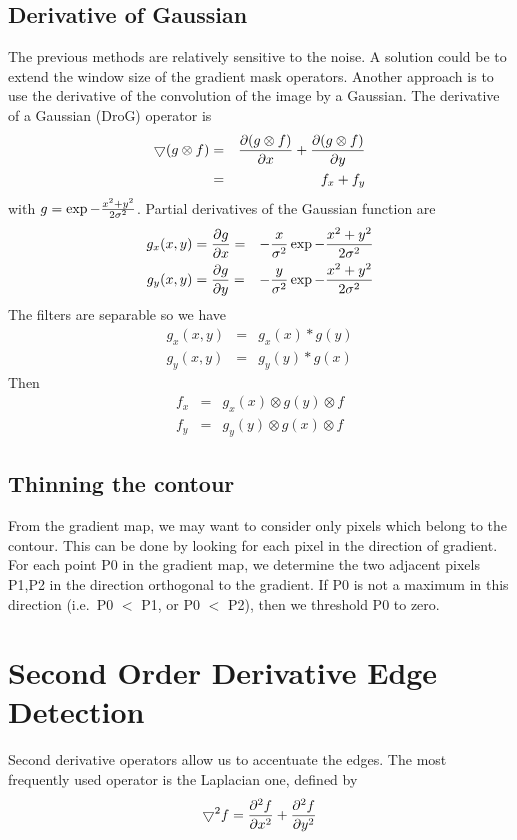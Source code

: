 \clearpage

\subsection{Derivative of Gaussian}
The previous methods are relatively sensitive to the noise.  A solution 
could be to extend the window size of the gradient mask operators.
Another approach is to use  the derivative of the 
convolution of the image by a Gaussian.
The derivative of a Gaussian (DroG) operator is
\begin{eqnarray}
\bigtriangledown (g \otimes f) & =  & {\partial  (g \otimes f) \over \partial x} +
 {\partial  (g \otimes f) \over \partial y} \nonumber \\
  & =  & f_x + f_y
\end{eqnarray}
with $g = \exp{- {x^2+y^2 \over {2\sigma^2}}}$. Partial derivatives of the
Gaussian function are
\begin{eqnarray}
g_x(x,y) & = {\partial  g  \over \partial x} = & - {x \over \sigma^2} \exp{- {x^2+y^2 \over {2\sigma^2}}} \nonumber \\
g_y(x,y) & = {\partial  g  \over \partial y} = & - {y \over \sigma^2} \exp{- {x^2+y^2 \over {2\sigma^2}}}
\end{eqnarray}
The filters are separable so we have
\begin{eqnarray}
g_x(x,y) & = & g_x(x) * g(y) \nonumber \\
g_y(x,y) & = & g_y(y) * g(x)  
\end{eqnarray}
Then
\begin{eqnarray}
f_x & = & g_x (x) \otimes g(y) \otimes f \nonumber \\
f_y & = & g_y (y) \otimes g(x) \otimes f
\end{eqnarray}
 
\subsection{Thinning the contour}
From the gradient map, we may want to consider only pixels which belong to the
contour. This can be done by looking for each pixel in the direction of 
gradient. For each point P0 in the gradient map, we determine the two 
adjacent pixels P1,P2
in the direction orthogonal to the gradient. If P0 is not a maximum in 
this direction (i.e.\ P0 $<$ P1, or P0 $<$ P2), then we threshold P0 to 
zero.
 
\section{Second Order Derivative Edge Detection}
Second derivative operators allow us to accentuate the 
edges. The most frequently
used operator is the Laplacian one, defined by 
\begin{eqnarray}
\bigtriangledown^2 f = {\partial^2  f  \over \partial x^2} 
                     + {\partial^2  f  \over \partial y^2}
\end{eqnarray}


